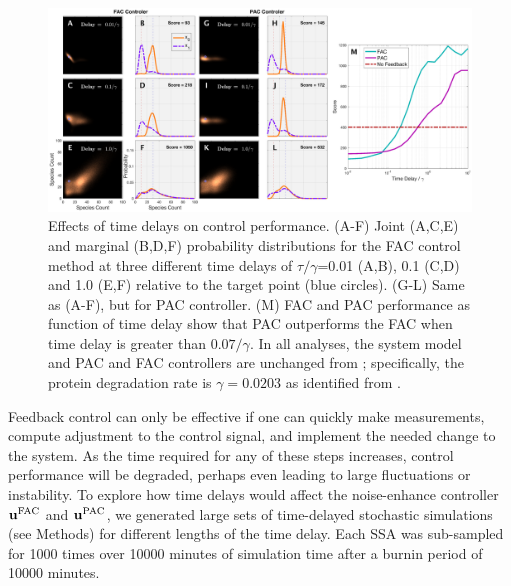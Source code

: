 \documentclass[12pt]{article}
\begin{document}
\begin{figure}
\begin{center}
\includegraphics[width=1\textwidth]{TimeDelayPerturbation.eps}
\vspace{-0.1in}
\caption{Effects of time delays on control performance. (A-F) Joint (A,C,E) and marginal (B,D,F) probability distributions for the FAC control method at three different time delays of $\tau/\gamma$=0.01 (A,B), 0.1 (C,D) and 1.0 (E,F) relative to the target point (blue circles). (G-L) Same as (A-F), but for PAC controller. (M) FAC and PAC performance as function of time delay show that PAC outperforms the FAC when time delay is greater than $0.07 /\gamma$. In all analyses, the system model and PAC and FAC controllers are unchanged from \cite{May2021}; specifically, the protein degradation rate is $\gamma = 0.0203$ as identified from \cite{Baumchager}.}
\label{Time}
\end{center}
\vspace{-0.2in}
\end{figure}

Feedback control can only be effective if one can quickly make measurements, compute adjustment to the control signal, and implement the needed change to the system. As the time required for any of these steps increases, control performance will be degraded, perhaps even leading to large fluctuations or instability. To explore how time delays would affect the noise-enhance controller $\mathbf{u}^{\rm FAC}$ and $\mathbf{u}^{\rm PAC}$, we generated large sets of time-delayed stochastic simulations (see Methods) for different lengths of the time delay. Each SSA was sub-sampled for 1000 times over 10000 minutes of simulation time after a burnin period of 10000 minutes.
\end{document}
